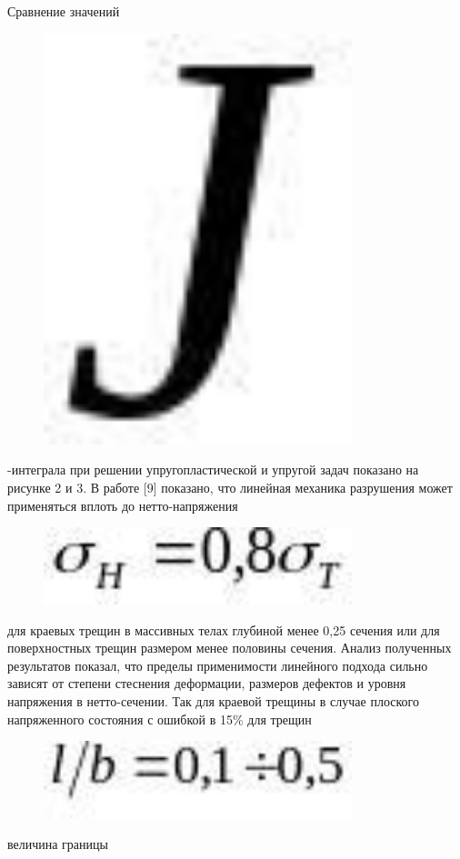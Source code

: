 Сравнение значений \begin{figure}[H]
	\centering
	\includegraphics[width=0.8\textwidth]{assets/1139}
	\caption*{}
\end{figure}-интеграла при
решении упругопластической и упругой задач показано на рисунке 2 и 3. В
работе {[}9{]} показано, что линейная механика разрушения может
применяться вплоть до нетто-напряжения
\begin{figure}[H]
	\centering
	\includegraphics[width=0.8\textwidth]{assets/1140}
	\caption*{}
\end{figure} для краевых трещин в массивных телах
глубиной менее 0,25 сечения или для поверхностных трещин размером менее
половины сечения. Анализ полученных результатов показал, что пределы
применимости линейного подхода сильно зависят от степени стеснения
деформации, размеров дефектов и уровня напряжения в нетто-сечении. Так
для краевой трещины в случае плоского напряженного состояния с ошибкой в
15\% для трещин \begin{figure}[H]
	\centering
	\includegraphics[width=0.8\textwidth]{assets/1141}
	\caption*{}
\end{figure} величина границы
